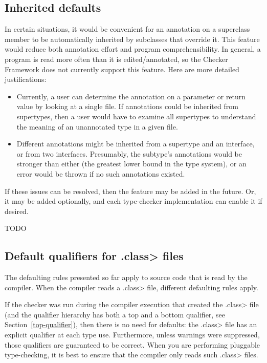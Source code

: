 \subsection{Inherited defaults\label{inherited-defaults}}

In certain situations, it would be convenient for an annotation on a
superclass member to be automatically inherited by subclasses that override
it.  This feature would reduce both annotation effort and program
comprehensibility.  In general, a program is read more often than it is
edited/annotated, so the Checker Framework does not currently support this
feature.  Here are more detailed justifications:

\begin{itemize}

\item
  Currently, a user can determine the annotation on a parameter or return
  value by looking at a single file.  If annotations could be inherited
  from supertypes, then a user would have to examine all supertypes to
  understand the meaning of an unannotated type in a given file.

\item
  Different annotations might be inherited from a supertype and an
  interface, or from two interfaces.  Presumably, the subtype's annotations
  would be stronger than either (the greatest lower bound in the type
  system), or an error would be thrown if no such annotations existed.

\end{itemize}

If these issues can be resolved, then the feature may be added in the
future.  Or, it may be added optionally, and each type-checker
implementation can enable it if desired.


\iffalse TODO
\subsection{Default qualifiers for \<.class> files\label{defaults-classfile}}

The defaulting rules presented so far apply to source code that is read by
the compiler.  When the compiler reads a \<.class> file, different
defaulting rules apply.

If the checker was run during the compiler execution that created the
\<.class> file (and the qualifier hierarchy has both a top and a bottom
qualifier, see Section~\ref{top-qualifier}), then there is no need for
defaults:  the \<.class> file has an explicit qualifier at each type use.
Furthermore, unless warnings were suppressed, those qualifiers are
guaranteed to be correct.
When you are performing pluggable type-checking,
it is best to ensure that the compiler only reads such \<.class> files.


